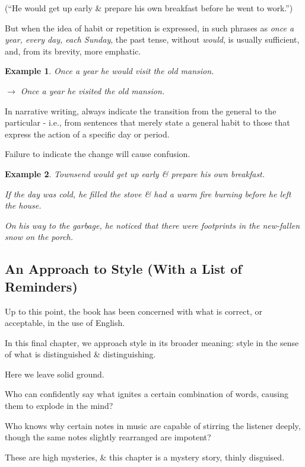 \documentclass{article}
\newtheorem{example}{Example}
\begin{document}
\begin{enumerate}
	(``He would get up early \& prepare his own breakfast before he went to work.'')
	
	But when the idea of habit or repetition is expressed, in such phrases as {\it once a year, every day, each Sunday}, the past tense, without {\it would}, is usually sufficient, and, from its brevity, more emphatic.
	\begin{example}
		Once a year he would visit the old mansion.
		
		$\to$ Once a year he visited the old mansion.
	\end{example}
	In narrative writing, always indicate the transition from the general to the particular - i.e., from sentences that merely state a general habit to those that express the action of a specific day or period.
	
	Failure to indicate the change will cause confusion.
	\begin{example}
		Townsend would get up early \& prepare his own breakfast.
		
		If the day was cold, he filled the stove \& had a warm fire burning before he left the house.
		
		On his way to the garbage, he noticed that there were footprints in the new-fallen snow on the porch.
	\end{example}
\end{enumerate}


\subsection{An Approach to Style (With a List of Reminders)}
Up to this point, the book has been concerned with what is correct, or acceptable, in the use of English.

In this final chapter, we approach style in its broader meaning: style in the sense of what is distinguished \& distinguishing.

Here we leave solid ground.

Who can confidently say what ignites a certain combination of words, causing them to explode in the mind?

Who knows why certain notes in music are capable of stirring the listener deeply, though the same notes slightly rearranged are impotent?

These are high mysteries, \& this chapter is a mystery story, thinly disguised.
\end{document}
